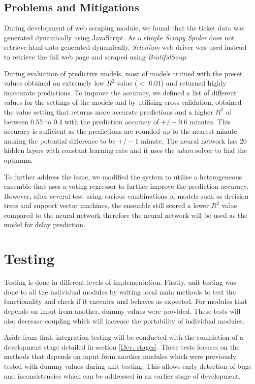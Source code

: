 \documentclass[11pt]{article}
\begin{document}
\subsection{Problems and Mitigations} \label{Problems}
During development of web scraping module, we found that the ticket data was generated dynamically using JavaScript. As a simple \textit{Scrapy Spider} does not retrieve html data generated dynamically, \textit{Selenium} web driver was used instead to retrieve the full web page and scraped using \textit{BeatifulSoup}.

During evaluation of predictive models, most of models trained with the preset values obtained an extremely low $R^2$ value ($<$ 0.01) and returned highly inaccurate predictions. To improve the accuracy, we defined a list of different values for the settings of the models and by utilising cross validation, obtained the value setting that returns more accurate predictions and a higher $R^2$ of between 0.55 to 0.4 with the prediction accuracy of $+/-0.6$ minutes. This accuracy is sufficient as the predictions are rounded up to the nearest minute making the potential difference to be $+/- 1$ minute. The neural network has 20 hidden layers with constant learning rate and it uses the \textit{adam} solver to find the optimum.

To further address the issue, we modified the system to utilise a heterogeneous ensemble that uses a voting regressor to further improve the prediction accuracy. However, after several test using various combinations of models such as decision trees and support vector machines, the ensemble still scored a lower $R^2$ value compared to the neural network therefore the neural network will be used as the model for delay prediction.

\section{Testing}
Testing is done in different levels of implementation. Firstly, unit testing was done to all the individual modules by writing local main methods to test the functionality and check if it executes and behaves as expected. For modules that depends on input from another, dummy values were provided. These tests will also decrease coupling which will increase the portability of individual modules.

Aside from that, integration testing will be conducted with the completion of a development stage detailed in section \ref{Dev. stages}. These tests focuses on the methods that depends on input from another modules which were previously tested with dummy values during unit testing. This allows early detection of bugs and inconsistencies which can be addressed in an earlier stage of development.
\end{document}
